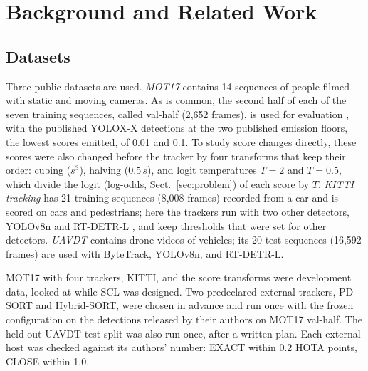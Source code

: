 \documentclass[pdflatex,sn-mathphys-num,iicol]{sn-jnl}
\newcommand{\scl}{SCL}
\begin{document}
\section{Background and Related Work}\label{sec:related}

\subsection{Datasets}\label{sec:data}
Three public datasets are used. \emph{MOT17} \cite{milan2016mot16} contains 14 sequences of
people filmed with static and moving cameras. As is common, the second half of each of the seven
training sequences, called val-half (2,652 frames), is used for evaluation \cite{zhang2022bytetrack},
with the published YOLOX-X detections \cite{ge2021yolox} at the two published emission floors, the
lowest scores emitted, of 0.01 and 0.1. To study score changes directly, these scores were also
changed before the tracker by four transforms that keep their order: cubing ($s^3$), halving
($0.5\,s$), and logit temperatures $T=2$ and $T=0.5$, which divide the logit (log-odds, Sect.~\ref{sec:problem}) of each score by $T$.
\emph{KITTI tracking} \cite{geiger2012kitti} has 21 training sequences (8,008 frames) recorded from
a car and is scored on cars and pedestrians; here the trackers run with two other detectors,
YOLOv8n \cite{jocher2023yolov8} and RT-DETR-L \cite{zhao2024rtdetr}, and keep thresholds that were
set for other detectors. \emph{UAVDT} \cite{du2018uavdt} contains drone videos of vehicles; its 20
test sequences (16,592 frames) are used with ByteTrack, YOLOv8n, and RT-DETR-L.

MOT17 with four trackers, KITTI, and the score transforms were development data, looked at while
\scl{} was designed. Two predeclared external trackers, PD-SORT and Hybrid-SORT, were chosen in
advance and run once with the frozen configuration on the detections released by their authors on
MOT17 val-half. The held-out UAVDT test split was also run once, after a written plan. Each
external host was checked against its authors' number: EXACT within 0.2 HOTA points, CLOSE within
1.0.
\end{document}
